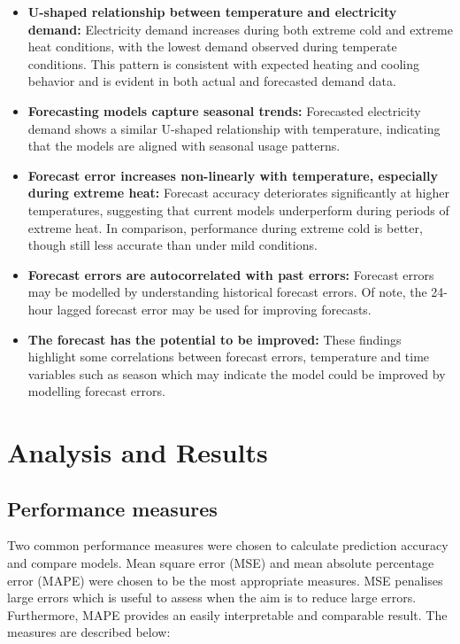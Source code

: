 \documentclass[mstat,12pt]{unswthesis}
\begin{document}
\begin{itemize}
\item
  \textbf{U-shaped relationship between temperature and electricity demand:} Electricity demand increases during both extreme cold and extreme heat conditions, with the lowest demand observed during temperate conditions. This pattern is consistent with expected heating and cooling behavior and is evident in both actual and forecasted demand data.
\item
  \textbf{Forecasting models capture seasonal trends:} Forecasted electricity demand shows a similar U-shaped relationship with temperature, indicating that the models are aligned with seasonal usage patterns.
\item
  \textbf{Forecast error increases non-linearly with temperature, especially during extreme heat:} Forecast accuracy deteriorates significantly at higher temperatures, suggesting that current models underperform during periods of extreme heat. In comparison, performance during extreme cold is better, though still less accurate than under mild conditions.
\item
  \textbf{Forecast errors are autocorrelated with past errors:} Forecast errors may be modelled by understanding historical forecast errors. Of note, the 24-hour lagged forecast error may be used for improving forecasts.
\item
  \textbf{The forecast has the potential to be improved:} These findings highlight some correlations between forecast errors, temperature and time variables such as season which may indicate the model could be improved by modelling forecast errors.
\end{itemize}

\chapter{Analysis and Results}\label{analysis-and-results}

\section{Performance measures}\label{performance-measures}

Two common performance measures were chosen to calculate prediction accuracy and compare models. Mean square error (MSE) and mean absolute percentage error (MAPE) were chosen to be the most appropriate measures. MSE penalises large errors which is useful to assess when the aim is to reduce large errors. Furthermore, MAPE provides an easily interpretable and comparable result. The measures are described below:
\end{document}
